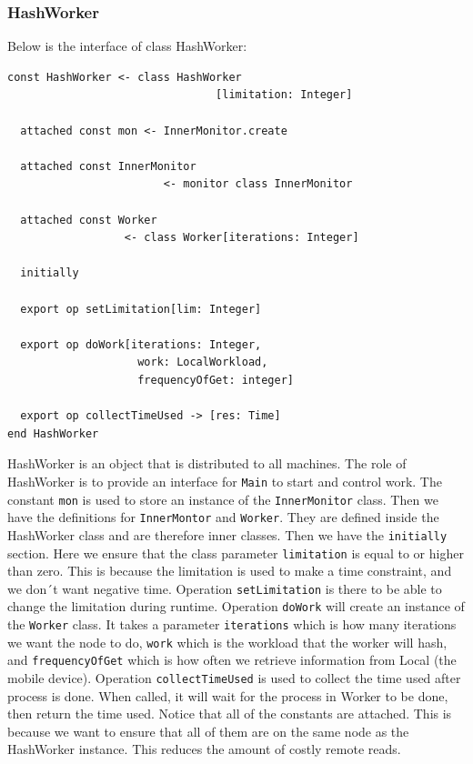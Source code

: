 \subsubsection{HashWorker}
Below is the interface of class HashWorker:
\begin{lstlisting}[language=emerald]
const HashWorker <- class HashWorker
                                [limitation: Integer]

  attached const mon <- InnerMonitor.create

  attached const InnerMonitor 
                        <- monitor class InnerMonitor

  attached const Worker
                  <- class Worker[iterations: Integer]

  initially

  export op setLimitation[lim: Integer]
  
  export op doWork[iterations: Integer, 
                    work: LocalWorkload, 
                    frequencyOfGet: integer]

  export op collectTimeUsed -> [res: Time]
end HashWorker
\end{lstlisting}
HashWorker is an object that is distributed to all machines. The role of HashWorker is to provide an interface for \verb|Main| to start and control work. The constant \verb|mon| is used to store an instance of the \verb|InnerMonitor| class. Then we have the definitions for \verb|InnerMontor| and \verb|Worker|. They are defined inside the HashWorker class and are therefore inner classes. Then we have the \verb|initially| section. Here we ensure that the class parameter \verb|limitation| is equal to or higher than zero. This is because the limitation is used to make a time constraint, and we don´t want negative time. Operation \verb|setLimitation| is there to be able to change the limitation during runtime. Operation \verb|doWork| will create an instance of the \verb|Worker| class. It takes a parameter \verb|iterations| which is how many iterations we want the node to do, \verb|work| which is the workload that the worker will hash, and \verb|frequencyOfGet| which is how often we retrieve information from Local (the mobile device). Operation \verb|collectTimeUsed| is used to collect the time used after process is done. When called, it will wait for the process in Worker to be done, then return the time used.
Notice that all of the constants are attached. This is because we want to ensure that all of them are on the same node as the HashWorker instance. This reduces the amount of costly remote reads.




